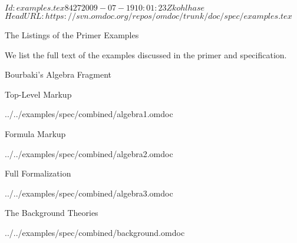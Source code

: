 \svnInfo $Id: examples.tex 8427 2009-07-19 10:01:23Z kohlhase $
\svnKeyword $HeadURL: https://svn.omdoc.org/repos/omdoc/trunk/doc/spec/examples.tex $

\begin{omgroup}[id=examples]{The Listings of the Primer Examples}

  We list the full text of the examples discussed in the {\omdoc} primer and
  specification.

\begin{omgroup}[id=examples.algebra]{Bourbaki's Algebra  Fragment}

\begin{omgroup}[id=examples.algebra1]{Top-Level Markup}

  {../../examples/spec/combined/algebra1.omdoc}
\end{omgroup}

\begin{omgroup}[id=examples.algebra2]{Formula Markup}

  {../../examples/spec/combined/algebra2.omdoc}
\end{omgroup}

\begin{omgroup}[id=examples.algebra3]{Full Formalization}

  {../../examples/spec/combined/algebra3.omdoc}
\end{omgroup}

\begin{omgroup}[id=examples.background]{The Background Theories}

  {../../examples/spec/combined/background.omdoc}
\end{omgroup}
\end{omgroup}


\end{omgroup}
